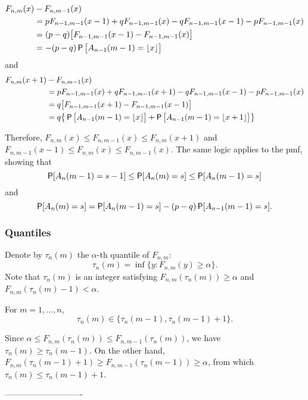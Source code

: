 \documentclass[11pt,draft]{article}
\begin{document}
\begin{align*}
 F_{n,m}(x) &- F_{n,m-1}(x) \\
&= p F_{n-1,m-1}(x-1) + q F_{n-1,m-1}(x) - q F_{n-1,m-1}(x-1)
 - p F_{n-1,m-1}(x) \\
&= (p-q) \big[ F_{n-1,m-1}(x-1) - F_{n-1,m-1}(x) \big] \\
&= -(p-q) \P\big[A_{n-1}(m-1) = \lfloor x \rfloor\big]
\end{align*}
and
\begin{align*}
 F_{n,m}(x+1) &- F_{n,m-1}(x) \\
&= p F_{n-1,m-1}(x) + q F_{n-1,m-1}(x+1) - q F_{n-1,m-1}(x-1)
 - p F_{n-1,m-1}(x) \\
&= q\big[ F_{n-1,m-1}(x+1) - F_{n-1,m-1}(x-1) \big] \\
&= q \big\{ \P\big[A_{n-1}(m-1) = \lfloor x \rfloor\big] +
\P\big[A_{n-1}(m-1) = \lfloor x+1 \rfloor\big] \big\}
\end{align*}

Therefore, $F_{n,m}(x) \leq F_{n,m-1}(x) \leq F_{n,m}(x+1)$ and $F_{n,m-1}(x-1) \leq F_{n,m}(x) \leq F_{n,m-1}(x)$. The same logic applies to the pmf, showing that 
\[ \P[A_n(m-1) = s-1] \leq \P[A_n(m)  = s] \leq \P[A_n(m-1) = s] \]
and
\[ \P[A_n(m)  = s] = \P[A_n(m-1) = s] - (p-q)\P[A_{n-1}(m-1) = s]. \]%


\subsubsection{Quantiles}

Denote by $\tau_n(m)$ the $\alpha$-th quantile of $F_{n,m}$:
\[ \tau_n(m) = \inf\{y : F_{n,m}(y) \geq \alpha \}. \]
Note that $\tau_n(m)$ is an integer satisfying $F_{n,m}(\tau_n(m)) \geq \alpha$ and $F_{n,m}(\tau_n(m) - 1) < \alpha$.

\begin{claim}
For $m = 1,\dots,n$,
\[ \tau_n(m) \in \{ \tau_n(m-1), \tau_n(m-1) + 1 \}. \]
\end{claim}
\begin{pf}
Since $\alpha \leq F_{n,m}(\tau_n(m)) \leq F_{n,m-1}(\tau_n(m))$, we have $\tau_n(m) \geq \tau_n(m-1)$.
On the other hand, $F_{n,m}(\tau_n(m-1)+1) \geq F_{n,m-1}(\tau_n(m-1)) \geq \alpha$, from which $\tau_n(m) \leq \tau_n(m-1) + 1$.
\end{pf}

----------------------------

\end{document}
